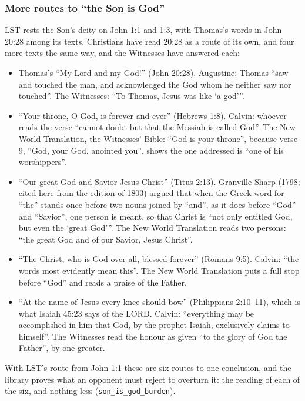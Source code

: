 \documentclass[11pt,paper=\testimonypaper,DIV=13,parskip=false]{scrartcl}
\begin{document}
\subsubsection*{More routes to “the Son is God”}
LST rests the Son’s deity on John 1:1 and 1:3, with Thomas’s words in John 20:28 among its texts. Christians have read 20:28 as a route of its own, and four more texts the same way, and the Witnesses have answered each:

\begin{itemize}
  \item Thomas’s “My Lord and my God!” (John 20:28). Augustine: Thomas “saw and touched the man, and acknowledged the God whom he neither saw nor touched”. The Witnesses: “To Thomas, Jesus was like ‘a god’”.
  \item “Your throne, O God, is forever and ever” (Hebrews 1:8). Calvin: whoever reads the verse “cannot doubt but that the Messiah is called God”. The New World Translation, the Witnesses’ Bible: “God is your throne”, because verse 9, “God, your God, anointed you”, shows the one addressed is “one of his worshippers”.
  \item “Our great God and Savior Jesus Christ” (Titus 2:13). Granville Sharp (1798; cited here from the edition of 1803) argued that when the Greek word for “the” stands once before two nouns joined by “and”, as it does before “God” and “Savior”, one person is meant, so that Christ is “not only entitled God, but even the ‘great God’”. The New World Translation reads two persons: “the great God and of our Savior, Jesus Christ”.
  \item “The Christ, who is God over all, blessed forever” (Romans 9:5). Calvin: “the words most evidently mean this”. The New World Translation puts a full stop before “God” and reads a praise of the Father.
  \item “At the name of Jesus every knee should bow” (Philippians 2:10–11), which is what Isaiah 45:23 says of the LORD. Calvin: “everything may be accomplished in him that God, by the prophet Isaiah, exclusively claims to himself”. The Witnesses read the honour as given “to the glory of God the Father”, by one greater.
\end{itemize}
With LST’s route from John 1:1 these are six routes to one conclusion, and the library proves what an opponent must reject to overturn it: the reading of each of the six, and nothing less (\texttt{son\_\allowbreak{}is\_\allowbreak{}god\_\allowbreak{}burden}).
\end{document}

